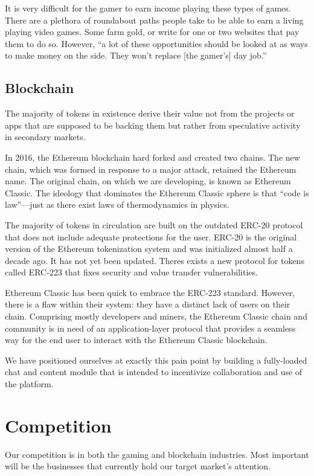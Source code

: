 \documentclass[11pt]{report}
\begin{document}
It is very difficult for the gamer to earn income playing these types of games. There are a plethora of roundabout paths people take to be able to earn a living playing video games. Some farm gold, or write for one or two websites that pay them to do so. However, ``a lot of these opportunities should be looked at as ways to make money on the side. They won’t replace [the gamer's] day job.''\cite{make-money-playing-games}
\subsection{Blockchain}
The majority of tokens in existence derive their value not from the projects or apps that are supposed to be backing them but rather from speculative activity in secondary markets.

In 2016, the Ethereum blockchain hard forked and created two chains. The new chain, which was formed in response to a major attack, retained the Ethereum name. The original chain, on which we are developing, is known as Ethereum Classic. The ideology that dominates the Ethereum Classic sphere is that ``code is law''\cite{code-is-law}---just as there exist laws of thermodynamics in physics.

The majority of tokens in circulation are built on the outdated ERC-20 protocol that does not include adequate protections for the user. ERC-20 is the original version of the Ethereum tokenization system and was initialized almost half a decade ago. It has not yet been updated. Theres exists a new protocol for tokens called ERC-223 that fixes security and value transfer vulnerabilities.\cite{erc223}

Ethereum Classic has been quick to embrace the ERC-223 standard. However, there is a flaw within their system: they have a distinct lack of users on their chain. Comprising mostly developers and miners, the Ethereum Classic chain and community is in need of an application-layer protocol that provides a seamless way for the end user to interact with the Ethereum Classic blockchain.

We have positioned ourselves at exactly this pain point by building a fully-loaded chat and content module that is intended to incentivize collaboration and use of the platform.
\section{Competition}
Our competition is in both the gaming and blockchain industries. Most important will be the businesses that currently hold our target market's attention.
\end{document}
